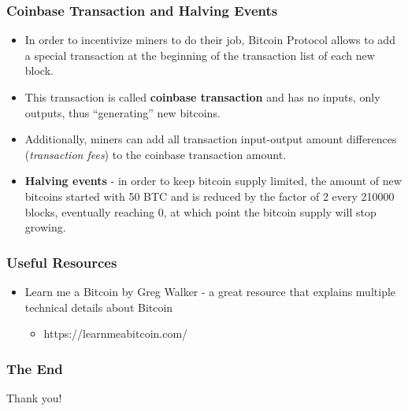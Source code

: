 \documentclass{beamer}
\begin{document}
\begin{frame}
  \frametitle{Coinbase Transaction and Halving Events}
  \begin{itemize}
  \item In order to incentivize miners to do their job, Bitcoin Protocol allows
    to add a special transaction at the beginning of the transaction list of
    each new block.
  \item This transaction is called \textbf{coinbase transaction} and has no
    inputs, only outputs, thus ``generating'' new bitcoins.
  \item Additionally, miners can add all transaction input-output amount
    differences (\textit{transaction fees}) to the coinbase transaction amount.
  \item \textbf{Halving events} - in order to keep bitcoin supply limited, the
    amount of new bitcoins started with 50 BTC and is reduced by the factor of 2
    every 210000 blocks, eventually reaching 0, at which point the bitcoin
    supply will stop growing.
  \end{itemize}
\end{frame}

\begin{frame}
  \frametitle{Useful Resources}
  \begin{itemize}
  \item Learn me a Bitcoin by Greg Walker - a great resource that explains
    multiple technical details about Bitcoin
    \begin{itemize}
    \item https://learnmeabitcoin.com/
    \end{itemize}
  \end{itemize}
\end{frame}

\begin{frame}
  \frametitle{The End}
  \begin{center}
    Thank you!
  \end{center}
\end{frame}
\end{document}

